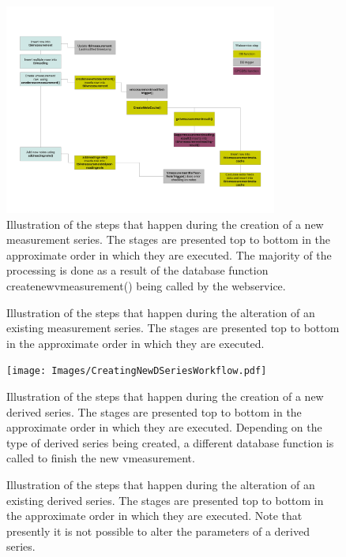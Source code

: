 \begin{figure}[hbtp]
  \centering
  \includegraphics[width=0.8\textwidth]{Images/CreatingNewMSeriesWorkflow.pdf}
  \caption{Illustration of the steps that happen during the creation of a new measurement series. The stages are presented top to bottom in the approximate order in which they are executed.  The majority of the processing is done as a result of the database function createnewvmeasurement() being called by the webservice.}
  \label{fig:creatingNewMSeries}
\end{figure}

\begin{figure}[hbtp]
  \centering
  \caption{Illustration of the steps that happen during the alteration of an existing measurement series. The stages are presented top to bottom in the approximate order in which they are executed.}
  \label{fig:editingNewMSeries}
\end{figure}

\begin{figure}[hbtp]
  \centering
  \texttt{[image: Images/CreatingNewDSeriesWorkflow.pdf]}
  \caption{Illustration of the steps that happen during the creation of a new derived series. The stages are presented top to bottom in the approximate order in which they are executed.  Depending on the type of derived series being created, a different database function is called to finish the new vmeasurement.}
  \label{fig:creatingNewMSeries}
\end{figure}

\begin{figure}[hbtp]
  \centering
  \caption{Illustration of the steps that happen during the alteration of an existing derived series. The stages are presented top to bottom in the approximate order in which they are executed. Note that presently it is not possible to alter the parameters of a derived series.}
  \label{fig:editingNewMSeries}
\end{figure}



